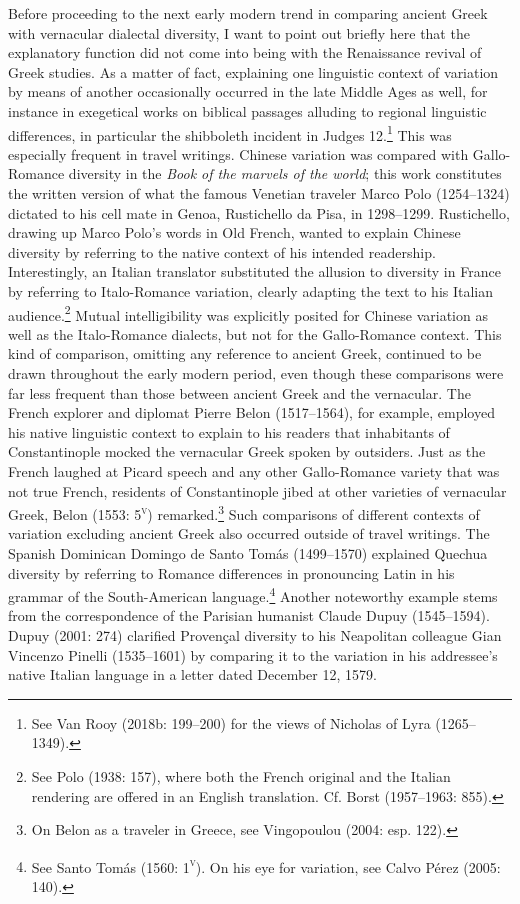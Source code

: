 \documentclass[12pt]{article}
\newenvironment{styleStandard}{\renewcommand\baselinestretch{1.25}\setlength\leftskip{0in}\setlength\rightskip{0in}\setlength\parindent{0.1972in}\setlength\parfillskip{0pt plus 1fil}\setlength\parskip{0in plus 1pt}\writerlistparindent\writerlistleftskip\leavevmode\normalfont\normalsize\writerlistlabel\ignorespaces}{\unskip\vspace{0in plus 1pt}\par}
\newcommand\writerlistleftskip{}
\newcommand\writerlistparindent{}
\newcommand\writerlistlabel{}
\begin{document}
\begin{styleStandard}
Before proceeding to the next early modern trend in comparing ancient Greek with vernacular dialectal diversity, I want to point out briefly here that the explanatory function did not come into being with the Renaissance revival of Greek studies. As a matter of fact, explaining one linguistic context of variation by means of another occasionally occurred in the late Middle Ages as well, for instance in exegetical works on biblical passages alluding to regional linguistic differences, in particular the shibboleth incident in Judges 12.\footnote{ See Van Rooy (2018b: 199–200) for the views of Nicholas of Lyra (1265–1349).} This was especially frequent in travel writings. Chinese variation was compared with Gallo-Romance diversity in the \textit{Book of the marvels of the world}; this work constitutes the written version of what the famous Venetian traveler Marco Polo (1254–1324) dictated to his cell mate in Genoa, Rustichello da Pisa, in 1298–1299. Rustichello, drawing up Marco Polo’s words in Old French, wanted to explain Chinese diversity by referring to the native context of his intended readership. Interestingly, an Italian translator substituted the allusion to diversity in France by referring to Italo-Romance variation, clearly adapting the text to his Italian audience.\footnote{ See Polo (1938: 157), where both the French original and the Italian rendering are offered in an English translation. Cf. Borst (1957–1963: 855).} Mutual intelligibility was explicitly posited for Chinese variation as well as the Italo-Romance dialects, but not for the Gallo-Romance context. This kind of comparison, omitting any reference to ancient Greek, continued to be drawn throughout the early modern period, even though these comparisons were far less frequent than those between ancient Greek and the vernacular. The French explorer and diplomat Pierre Belon (1517–1564), for example, employed his native linguistic context to explain to his readers that inhabitants of Constantinople mocked the vernacular Greek spoken by outsiders. Just as the French laughed at Picard speech and any other Gallo-Romance variety that was not true French, residents of Constantinople jibed at other varieties of vernacular Greek, Belon (1553: 5\textsc{\textsuperscript{v}}) remarked.\footnote{ On Belon as a traveler in Greece, see Vingopoulou (2004: esp. 122).} Such comparisons of different contexts of variation excluding ancient Greek also occurred outside of travel writings. The Spanish Dominican Domingo de Santo Tomás (1499–1570) explained Quechua diversity by referring to Romance differences in pronouncing Latin in his grammar of the South-American language.\footnote{ See Santo Tomás (1560: 1\textsc{\textsuperscript{v}}). On his eye for variation, see Calvo Pérez (2005: 140).} Another noteworthy example stems from the correspondence of the Parisian humanist Claude Dupuy (1545–1594). Dupuy (2001: 274) clarified Provençal diversity to his Neapolitan colleague Gian Vincenzo Pinelli (1535–1601) by comparing it to the variation in his addressee’s native Italian language in a letter dated December 12, 1579.
\end{styleStandard}
\end{document}

